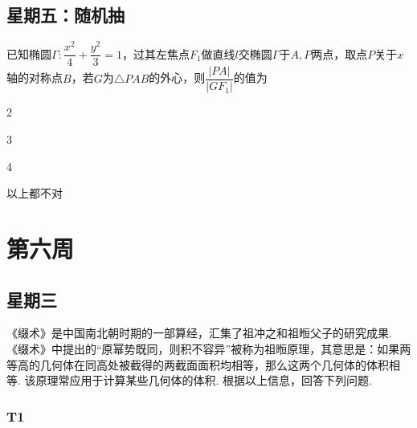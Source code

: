 \documentclass[UTF8,a4paper,11 pt]{ctexart}%
\begin{document}
	\subsection{星期五：随机抽}\noindent
	已知椭圆$ \varGamma:\dfrac{x^2}{4}+\dfrac{y^2}{3}=1 $，过其左焦点$ F_1 $做直线$ l $交椭圆$ \varGamma $于$ A,P $两点，取点$ P $关于$ x $轴的对称点$ B $，若$ G $为$ \triangle PAB $的外心，则$ \dfrac{|PA|}{|GF_1|} $的值为
	\begin{xchoices}[label-style= Alph]
		\item 2
		\item 3
		\item 4
		\item 以上都不对
	\end{xchoices}
	\clearpage\section{第六周}
	\subsection{星期三}\noindent
	《缀术》是中国南北朝时期的一部算经，汇集了祖冲之和祖暅父子的研究成果. 《缀术》中提出的“原幂势既同，则积不容异”被称为祖暅原理，其意思是：如果两等高的几何体在同高处被截得的两截面面积均相等，那么这两个几何体的体积相等. 该原理常应用于计算某些几何体的体积. 根据以上信息，回答下列问题. 
	\subsubsection{T1}\label{611}
\end{document}
